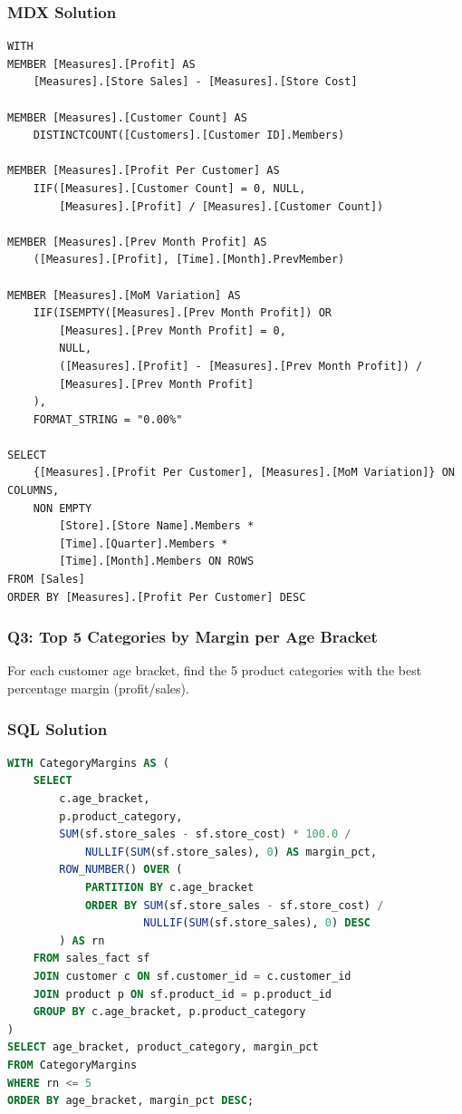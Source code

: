 \subsubsection*{MDX Solution}
\begin{lstlisting}[language=MDX]
WITH
MEMBER [Measures].[Profit] AS
    [Measures].[Store Sales] - [Measures].[Store Cost]

MEMBER [Measures].[Customer Count] AS
    DISTINCTCOUNT([Customers].[Customer ID].Members)

MEMBER [Measures].[Profit Per Customer] AS
    IIF([Measures].[Customer Count] = 0, NULL,
        [Measures].[Profit] / [Measures].[Customer Count])

MEMBER [Measures].[Prev Month Profit] AS
    ([Measures].[Profit], [Time].[Month].PrevMember)

MEMBER [Measures].[MoM Variation] AS
    IIF(ISEMPTY([Measures].[Prev Month Profit]) OR
        [Measures].[Prev Month Profit] = 0,
        NULL,
        ([Measures].[Profit] - [Measures].[Prev Month Profit]) /
        [Measures].[Prev Month Profit]
    ),
    FORMAT_STRING = "0.00%"

SELECT
    {[Measures].[Profit Per Customer], [Measures].[MoM Variation]} ON COLUMNS,
    NON EMPTY
        [Store].[Store Name].Members *
        [Time].[Quarter].Members *
        [Time].[Month].Members ON ROWS
FROM [Sales]
ORDER BY [Measures].[Profit Per Customer] DESC
\end{lstlisting}

\subsubsection{Q3: Top 5 Categories by Margin per Age Bracket}
\label{subsec:ex-q3}

\begin{theorybox}[frametitle={Exercise}]
For each customer age bracket, find the 5 product categories with the best percentage margin (profit/sales).
\end{theorybox}

\subsubsection*{SQL Solution}
\begin{lstlisting}[language=SQL]
WITH CategoryMargins AS (
    SELECT
        c.age_bracket,
        p.product_category,
        SUM(sf.store_sales - sf.store_cost) * 100.0 /
            NULLIF(SUM(sf.store_sales), 0) AS margin_pct,
        ROW_NUMBER() OVER (
            PARTITION BY c.age_bracket
            ORDER BY SUM(sf.store_sales - sf.store_cost) /
                     NULLIF(SUM(sf.store_sales), 0) DESC
        ) AS rn
    FROM sales_fact sf
    JOIN customer c ON sf.customer_id = c.customer_id
    JOIN product p ON sf.product_id = p.product_id
    GROUP BY c.age_bracket, p.product_category
)
SELECT age_bracket, product_category, margin_pct
FROM CategoryMargins
WHERE rn <= 5
ORDER BY age_bracket, margin_pct DESC;
\end{lstlisting}

